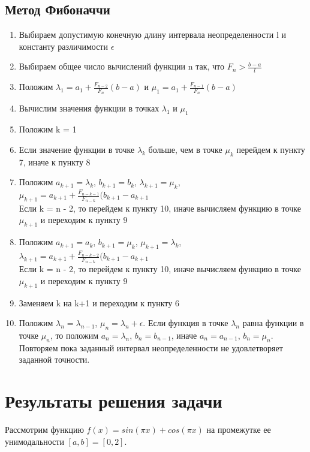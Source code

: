 \documentclass[main.tex]{subfiles}
\begin{document}
	
	
	
	\subsection{Метод Фибоначчи}
	\begin{enumerate}
		\item Выбираем допустимую конечную длину интервала неопределенности l и константу различимости $\epsilon$ 
		\item Выбираем общее число вычислений функции n так, что $F_n >\frac{b-a}{l}$
		\item Положим $\lambda_1 = a_1+\frac{F_{n-2}}{F_n}(b-a)$ и  $\mu_1 = a_1+\frac{F_{n-1}}{F_n}(b-a)$
		\item Вычислим значения функции в точках $\lambda_1$ и $\mu_1$
		\item Положим k = 1
		\item Если значение функции в точке $\lambda_k$ больше, чем в точке $\mu_k$ перейдем к пункту 7, иначе к пункту 8
		\item Положим $a_{k+1} = \lambda_k$, $b_{k+1} = b_k$, $\lambda_{k+1} = \mu_k$, $\mu_{k+1} = a_{k+1}+\frac{F_{n-k-1}}{F_{n-k}}(b_{k+1}-a_{k+1}$\\
		Если k = n - 2, то перейдем к пункту 10, иначе вычисляем функцию в точке $\mu_{k+1}$ и переходим к пункту 9
		\item Положим $a_{k+1} = a_k$, $b_{k+1} = \mu_k$, $\mu_{k+1} = \lambda_k$, $\lambda_{k+1} = a_{k+1}+\frac{F_{n-k-2}}{F_{n-k}}(b_{k+1}-a_{k+1}$\\
		Если k = n - 2, то перейдем к пункту 10, иначе вычисляем функцию в точке $\mu_{k+1}$ и переходим к пункту 9
		\item Заменяем k на k+1 и переходим к пункту 6
		\item Положим $\lambda_{n} = \lambda_{n-1}$, $\mu_{n} = \lambda_n + \epsilon$. Если функция в точке $\lambda_n$ равна функции в точке $\mu_n$, то положим $a_n = \lambda_n$, $b_n=b_{n-1}$, иначе $a_n = a_{n-1}$, $b_n=\mu_n$. Повторяем пока заданный интервал неопределенности не удовлетворяет заданной точности.
	\end{enumerate}
	
	\section{Результаты решения задачи}
	Рассмотрим функцию \newline$f(x) = sin(\pi x) + cos(\pi x)$ на промежутке ее унимодальности $[a, b] = [0, 2].$\\
	
\end{document}
